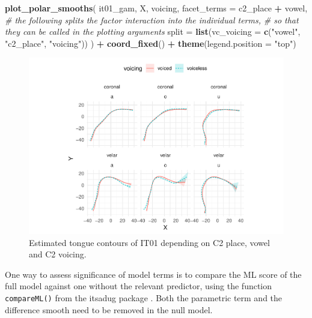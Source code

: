 \documentclass[11pt,]{article}
\newenvironment{Shaded}{\begin{snugshade}}{\end{snugshade}}
\newcommand{\CommentTok}[1]{\textcolor[rgb]{0.56,0.35,0.01}{\textit{#1}}}
\newcommand{\DataTypeTok}[1]{\textcolor[rgb]{0.13,0.29,0.53}{#1}}
\newcommand{\KeywordTok}[1]{\textcolor[rgb]{0.13,0.29,0.53}{\textbf{#1}}}
\newcommand{\NormalTok}[1]{#1}
\newcommand{\OperatorTok}[1]{\textcolor[rgb]{0.81,0.36,0.00}{\textbf{#1}}}
\newcommand{\StringTok}[1]{\textcolor[rgb]{0.31,0.60,0.02}{#1}}
\begin{document}
\begin{Shaded}
\begin{Highlighting}[]
\KeywordTok{plot_polar_smooths}\NormalTok{(}
\NormalTok{  it01_gam,}
\NormalTok{  X,}
\NormalTok{  voicing,}
  \DataTypeTok{facet_terms =}\NormalTok{ c2_place }\OperatorTok{+}\StringTok{ }\NormalTok{vowel,}
  \CommentTok{# the following splits the factor interaction into the individual terms,}
  \CommentTok{# so that they can be called in the plotting arguments}
  \DataTypeTok{split =} \KeywordTok{list}\NormalTok{(}\DataTypeTok{vc_voicing =} \KeywordTok{c}\NormalTok{(}\StringTok{"vowel"}\NormalTok{, }\StringTok{"c2_place"}\NormalTok{, }\StringTok{"voicing"}\NormalTok{))}
\NormalTok{) }\OperatorTok{+}
\StringTok{  }\KeywordTok{coord_fixed}\NormalTok{() }\OperatorTok{+}
\StringTok{  }\KeywordTok{theme}\NormalTok{(}\DataTypeTok{legend.position =} \StringTok{"top"}\NormalTok{)}
\end{Highlighting}
\end{Shaded}

\begin{figure}

{\centering \includegraphics[width=\linewidth]{2018-polar-gam_files/figure-latex/Figure04} 

}

\caption{Estimated tongue contours of IT01 depending on C2 place, vowel and C2 voicing.}\label{f:Figure04}
\end{figure}

One way to assess significance of model terms is to compare the ML score
of the full model against one without the relevant predictor, using the
function \texttt{compareML()} from the itsadug package
\citep{van-rij2017}. Both the parametric term and the difference smooth
need to be removed in the null model.
\end{document}
